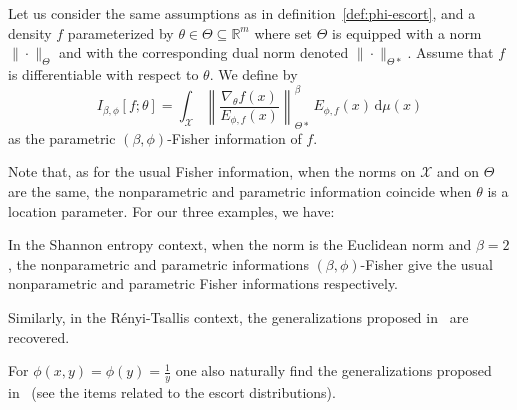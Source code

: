 \documentclass[entropy,article,submit,moreauthors,pdftex]{Definitions/mdpi}
\newcounter{GaussExample}%
\newcounter{qGaussExample}%
\newcounter{arcsineExample}%
\def\dmu{\mathrm{d}\mu}%
\def\Rset{\mathbb{R}}%
\def\X{\mathcal{X}}%
\begin{document}
\begin{Definition}
\label{def:p-phi-Fisher}
%
  Let us  consider the  same assumptions as  in definition~\ref{def:phi-escort},
  and a density $f$ parameterized by $\theta \in \Theta \subseteq \Rset^m$ where
  set  $\Theta$ is  equipped with  a norm  $\| \cdot  \|_{\Theta}$ and  with the
  corresponding dual norm  denoted $\| \cdot \|_{\Theta*}$.  Assume  that $f$ is
  differentiable with respect to $\theta$. We define by
  \begin{equation}\label{eq:p-phi-Fisher}
  I_{\beta,\phi}[f;\theta]     =     \int_\X     \left\|     \frac{\nabla_\theta
    f(x)}{E_{\phi,f}(x)} \right\|_{\Theta*}^\beta \, E_{\phi,f}(x) \, \dmu(x)
  \end{equation}
  as the parametric $(\beta,\phi)$-Fisher information of $f$.
\end{Definition}
%
Note that, as  for the usual Fisher  information, when the norms on  $\X$ and on
$\Theta$ are  the same,  the nonparametric  and parametric  information coincide
when $\theta$ is a location parameter. For our three examples, we have:
%
%
\begin{Example}
  In the Shannon entropy context, when the norm is the Euclidean norm and $\beta
  = 2$, the nonparametric and parametric informations $(\beta,\phi)$-Fisher give
  the usual nonparametric and parametric Fisher informations respectively.
\end{Example}
%
\begin{Example}
  Similarly,  in  the  R\'enyi-Tsallis  context,  the  generalizations  proposed
  in~\cite{Ber12:06_1, Ber12:06_2, Ber13} are recovered.
\end{Example}
%
\begin{Example}
  For  $\phi(x,y)  =  \phi(y)  =   \frac{1}{y}$  one  also  naturally  find  the
  generalizations  proposed  in~\cite{Ber12:06_1,  Ber12:06_2, Ber13}  (see  the
  items related to the escort distributions).
\end{Example}

\
\end{document}
